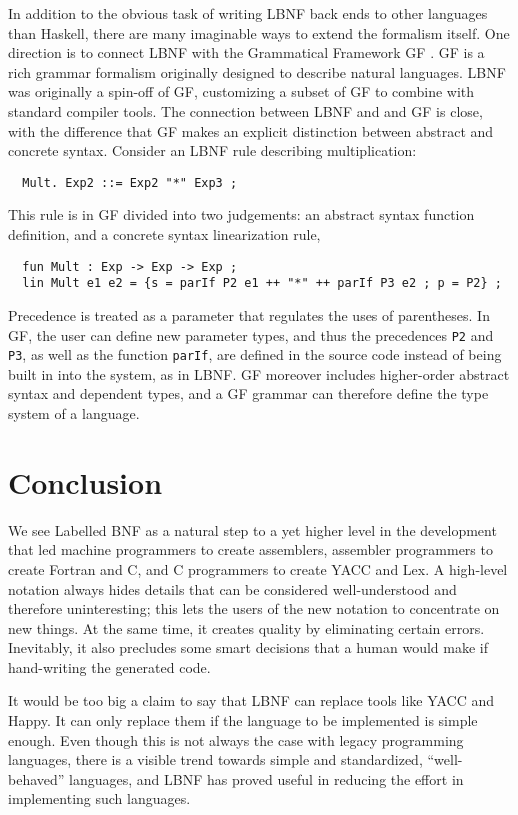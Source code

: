 \documentclass[10pt]{article}
\begin{document}
In addition to the obvious task of writing LBNF back ends to other
languages than Haskell, there are many imaginable ways to extend
the formalism itself. One direction is to connect LBNF with the Grammatical
Framework GF \cite{GF-paper}. GF is a rich grammar formalism originally designed
to describe natural languages. LBNF was originally a spin-off of GF,
customizing a subset of GF to combine with standard compiler tools.
The connection between LBNF and and GF is close, with the difference
that GF makes an explicit distinction between abstract and concrete syntax.
Consider an LBNF rule describing multiplication:
\begin{verbatim}
  Mult. Exp2 ::= Exp2 "*" Exp3 ;
\end{verbatim}
This rule is in GF divided into two judgements: an abstract syntax function
definition, and a concrete syntax linearization rule,
\begin{verbatim}
  fun Mult : Exp -> Exp -> Exp ;
  lin Mult e1 e2 = {s = parIf P2 e1 ++ "*" ++ parIf P3 e2 ; p = P2} ;
\end{verbatim}
Precedence is treated as a parameter that regulates the uses
of parentheses. In GF, the user can define new parameter types, and thus
the precedences {\tt P2} and {\tt P3}, as well as the function {\tt parIf},
are defined in the source code instead of being built in into the system,
as in LBNF.
GF moreover includes higher-order abstract syntax and
dependent types, and a GF grammar can therefore define the type system of
a language.


\section{Conclusion}

We see Labelled BNF as a natural step
to a yet higher level in the development that led
machine programmers to create assemblers,
assembler programmers to create Fortran and C,
and C programmers to create YACC and Lex.
A high-level notation always hides
details that can be considered well-understood and
therefore uninteresting; this lets the users of
the new notation to concentrate on new things.
At the same time, it creates quality by eliminating
certain errors. Inevitably, it also precludes
some smart decisions that a human would make
if hand-writing the generated code.

It would be too big a claim to say that LBNF can
replace tools like YACC and Happy. It can only replace them if
the language to be implemented is simple enough. Even though
this is not always the case with legacy programming languages,
there is a visible trend towards simple and standardized,
``well-behaved'' languages,
and LBNF has proved useful in reducing the effort in
implementing such languages.
\end{document}
